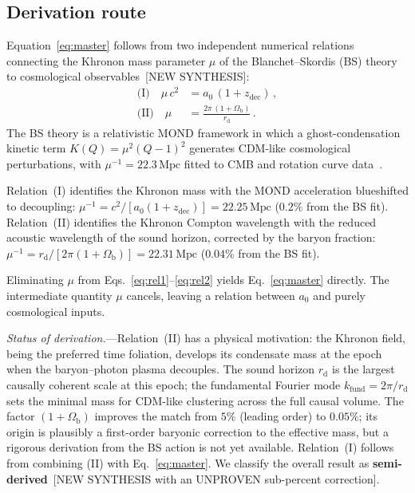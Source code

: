 \documentclass[prl,twocolumn,superscriptaddress,longbibliography]{revtex4-2}
\newcommand{\Mpc}{\,\mathrm{Mpc}}
\newcommand{\zdec}{z_{\mathrm{dec}}}
\newcommand{\rd}{r_{\mathrm{d}}}
\newcommand{\Ob}{\Omega_{\mathrm{b}}}
\newcommand{\azero}{a_0}
\begin{document}
\subsection{Derivation route}
\label{sec:derivation}

Equation~\eqref{eq:master} follows from
two independent numerical relations connecting the
Khronon mass parameter $\mu$ of the Blanchet--Skordis
(BS) theory~\cite{BS2024,BS2025} to cosmological
observables~[NEW SYNTHESIS]:
\begin{align}
  \text{(I)}\quad
  \mu\,c^2 &= \azero\,(1+\zdec) \,,
  \label{eq:rel1} \\[4pt]
  \text{(II)}\quad
  \mu &= \frac{2\pi\,(1+\Ob)}{\rd} \,.
  \label{eq:rel2}
\end{align}
The BS theory is a relativistic MOND framework
in which a ghost-condensation kinetic term
$K(Q) = \mu^2(Q-1)^2$ generates CDM-like
cosmological perturbations, with $\mu^{-1}=22.3\Mpc$
fitted to CMB and rotation curve data~\cite{BS2025}.

Relation~(I) identifies the Khronon mass with
the MOND acceleration blueshifted to decoupling:
$\mu^{-1} = c^2/[\azero(1+\zdec)] = 22.25\Mpc$
($0.2\%$ from the BS fit).
Relation~(II) identifies the Khronon Compton
wavelength with the reduced acoustic wavelength
of the sound horizon, corrected by the baryon
fraction: $\mu^{-1} = \rd/[2\pi(1+\Ob)] = 22.31\Mpc$
($0.04\%$ from the BS fit).

Eliminating $\mu$ from Eqs.~\eqref{eq:rel1}--\eqref{eq:rel2} yields
Eq.~\eqref{eq:master} directly.
The intermediate quantity $\mu$ cancels, leaving a
relation between $\azero$ and purely cosmological
inputs.

\emph{Status of derivation.}---Relation~(II) has a
physical motivation: the Khronon field, being the
preferred time foliation, develops its condensate mass
at the epoch when the baryon--photon plasma decouples.
The sound horizon $\rd$ is the largest causally coherent
scale at this epoch; the fundamental Fourier mode
$k_{\mathrm{fund}} = 2\pi/\rd$ sets the minimal mass
for CDM-like clustering across the full causal
volume.
The factor $(1+\Ob)$ improves the match from $5\%$
(leading order) to $0.05\%$; its origin is plausibly
a first-order baryonic correction to the
effective mass, but a rigorous derivation from the
BS action is not yet available.
Relation~(I) follows from combining (II) with
Eq.~\eqref{eq:master}.
We classify the overall result as
\textbf{semi-derived}~[NEW SYNTHESIS with an
UNPROVEN sub-percent correction].
\end{document}
